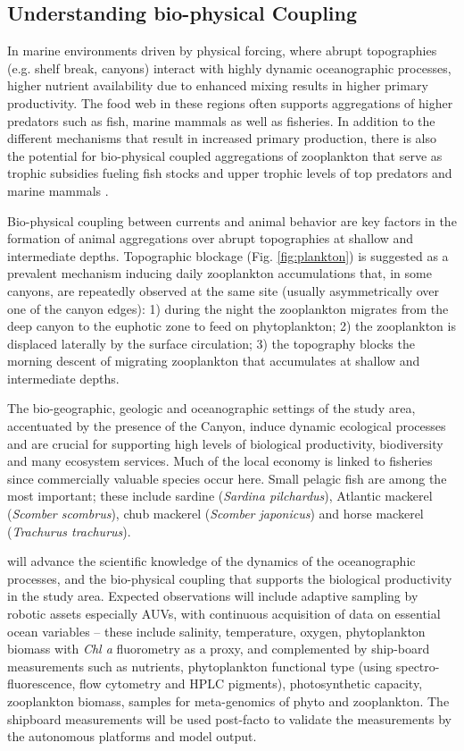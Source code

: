 \subsection{Understanding bio-physical Coupling}


In marine environments driven by physical forcing, where abrupt
topographies (e.g. shelf break, canyons) interact with highly dynamic
oceanographic processes, higher nutrient availability due to enhanced
mixing results in higher primary productivity.  The food web in these
regions often supports aggregations of higher predators such as fish,
marine mammals as well as fisheries. In addition to the different
mechanisms that result in increased primary production, there is also
the potential for bio-physical coupled aggregations of zooplankton
that serve as trophic subsidies fueling fish stocks and upper trophic
levels of top predators and marine mammals \cite{genin04}.

Bio-physical coupling between currents and animal behavior are key
factors in the formation of animal aggregations over abrupt
topographies at shallow and intermediate depths. Topographic blockage
(Fig. \ref{fig:plankton}) is suggested as a prevalent mechanism
inducing daily zooplankton accumulations that, in some canyons, are
repeatedly observed at the same site (usually asymmetrically over one
of the canyon edges): 1) during the night the zooplankton migrates
from the deep canyon to the euphotic zone to feed on phytoplankton; 2)
the zooplankton is displaced laterally by the surface circulation; 3)
the topography blocks the morning descent of migrating zooplankton
that accumulates at shallow and intermediate depths.

The bio-geographic, geologic and oceanographic settings of the study
area, accentuated by the presence of the \naz Canyon, induce dynamic
ecological processes and are crucial for supporting high levels of
biological productivity, biodiversity and many ecosystem
services. Much of the local economy is linked to fisheries since
commercially valuable species occur here. Small pelagic fish are among
the most important; these include sardine (\emph{Sardina pilchardus}),
Atlantic mackerel (\emph{Scomber scombrus}), chub mackerel
(\emph{Scomber japonicus}) and horse mackerel (\emph{Trachurus
  trachurus}).

\proj will advance the scientific knowledge of the dynamics of the
oceanographic processes, and the bio-physical coupling that supports
the biological productivity in the study area. Expected observations
will include adaptive sampling by robotic assets especially AUVs, with
continuous acquisition of data on essential ocean variables -- these
include salinity, temperature, oxygen, phytoplankton biomass with
\emph{Chl a} fluorometry as a proxy, and complemented by ship-board
measurements such as nutrients, phytoplankton functional type (using
spectro-fluorescence, flow cytometry and HPLC pigments), photosynthetic
capacity, zooplankton biomass, samples for meta-genomics of phyto and
zooplankton.  The shipboard measurements will be used post-facto to
validate the measurements by the autonomous platforms and model
output.

